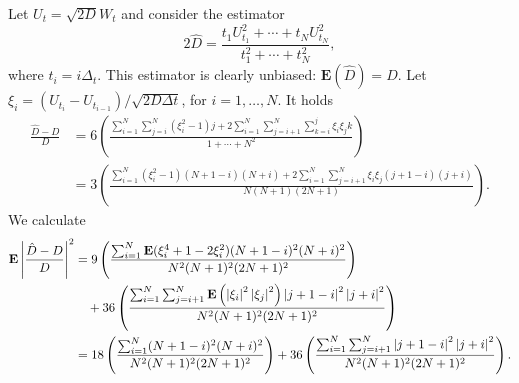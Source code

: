 \documentclass[11pt,a4paper]{article}
\newcommand{\expect}[0]{\mathbf{E}}
\theoremstyle{plain}
\numberwithin{equation}{section}
\begin{document}
Let $U_t = \sqrt{2 D} W_t$ and consider the estimator
\[
    2 \hat D = \frac{t_1 U_{t_1}^2 + \dotsb + t_N U_{t_N}^2}{t_1^2 + \dotsb + t_N^2},
\]
where $t_i = i \Delta_t$.
This estimator is clearly unbiased: $\expect (\hat D) = D$.
Let $\xi_i = (U_{t_{i}} - U_{t_{i-1}})/\sqrt{2D \Delta t}$, for $i = 1, \dotsc, N$.
It holds
\begin{align*}
    \frac{\hat D - D}{D}
    &= 6 \left( \frac{ \sum_{i=1}^{N} \sum_{j=i}^{N} (\xi_i ^2 - 1)  j  + 2 \sum_{i=1}^{N} \sum_{j=i+1}^{N} \sum_{k=i}^{j} \xi_i \xi_j k}
    {1 + \dotsb + N^2} \right) \\
    &= 3 \left( \frac{ \sum_{i=1}^{N} (\xi_i ^2 - 1)  (N+1-i)(N+i)  + 2 \sum_{i=1}^{N} \sum_{j=i+1}^{N} \xi_i \xi_j (j+1-i)(j+i)}
    { N(N+1)(2N+1)} \right).
\end{align*}
We calculate
\begin{align*}
    \expect \abs{ \frac{\hat D - D}{D} }^2
    &= 9 \left( \frac{ \sum_{i=1}^{N} \expect (\xi_i ^4 + 1 - 2 \xi_i^2)  (N+1-i)^2 (N+i)^2}
    { N^2 (N+1)^2 (2N+1)^2} \right) \\
    &\quad + 36 \left(  \frac{\sum_{i=1}^{N} \sum_{j=i+1}^{N} \expect \left( \abs{\xi_i}^2 \abs{\xi_j}^2 \right) \abs{j+1-i}^2 \abs{j+i}^2}
    { N^2 (N+1)^2 (2N+1)^2} \right) \\
    &= 18 \left( \frac{ \sum_{i=1}^{N}  (N+1-i)^2 (N+i)^2}
    { N^2 (N+1)^2 (2N+1)^2} \right)
    + 36 \left(  \frac{\sum_{i=1}^{N} \sum_{j=i+1}^{N} \abs{j+1-i}^2 \abs{j+i}^2}
    { N^2 (N+1)^2 (2N+1)^2} \right).
\end{align*}
\end{document}
